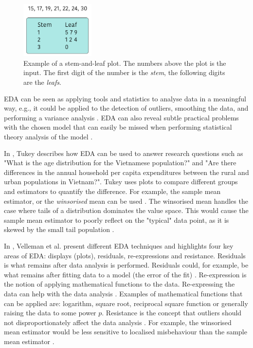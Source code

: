 \begin{figure} [h!]
    \centering
    \includegraphics[width=0.33\textwidth]{figures/stem-leaf-plot}
    \caption[Example of a stem-and-leaf plot]
    {\small Example of a stem-and-leaf plot. The numbers above the plot is the input.
    The first digit of the number is the \emph{stem}, the following digits are the \emph{leafs}.}
    \label{fig:stem-leaf-plot}
\end{figure}

EDA can be seen as applying tools and statistics to analyse data in a meaningful way, e.g., it could be applied to the detection of outliers, smoothing the data, and performing a variance analysis \cite{Anselin1999, Hoaglin2003, Tukey1977, Velleman1981}.
EDA can also reveal subtle practical problems with the chosen model that can easily be missed when performing statistical theory analysis of the model \cite{Gelman2003}.

In \cite{Tukey1977}, Tukey describes how EDA can be used to answer research questions such as "What is the age distribution for the Vietnamese population?" and "Are there differences in
the annual household per capita expenditures between the rural and urban populations in Vietnam?".
Tukey uses plots to compare different groups and estimators to quantify the difference.
For example, the sample mean estimator, or the \emph{winsorised} mean can be used \cite{Tukey1977}.
The winsorised mean handles the case where tails of a distribution dominates the value space.  
This would cause the sample mean estimator to poorly reflect on the "typical" data point, as it is skewed by the small tail population \cite{Tukey1977}.

In \cite{Velleman1981}, Velleman et al. present different EDA techniques and highlights four key areas of EDA: displays (plots), residuals, re-expressions and resistance.
Residuals is what remains after data analysis is performed.
Residuals could, for example, be what remains after fitting data to a model (the error of the fit) \cite{Velleman1981}.
Re-expression is the notion of applying mathematical functions to the data.
Re-expressing the data can help with the data analysis \cite{Hoaglin2003, Velleman1981}.
Examples of mathematical functions that can be applied are: logarithm, square root, reciprocal square function or generally raising the data to some power $p$.
Resistance is the concept that outliers should not disproportionately affect the data analysis \cite{Hoaglin2003, Velleman1981}.
For example, the winsorised mean estimator would be less sensitive to localised misbehaviour than the sample mean estimator \cite{Tukey1977}.

